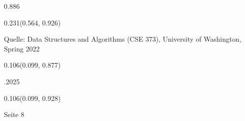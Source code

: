 \documentclass[aspectratio=169]{beamer}
\begin{document}
\begin{frame}[fragile]
\begin{textblock}{0.886}
\begin{minipage}[t][0.131\paperheight]{\linewidth}
  \end{minipage}
\end{textblock}
\begin{textblock}{0.231}(0.564, 0.926)
  \begin{minipage}[b][0.032\paperheight]{\linewidth}
    \raggedright
    \fontsize{3}{3.3}\selectfont Quelle: Data Structures and Algorithms (CSE 373), University of Washington, Spring 2022
  \end{minipage}
\end{textblock}
\begin{textblock}{0.106}(0.099, 0.877)
  \begin{minipage}[b][0.026\paperheight]{\linewidth}
    \raggedright
    \fontsize{3}{3.3}.2025
  \end{minipage}
\end{textblock}
\begin{textblock}{0.106}(0.099, 0.928)
  \begin{minipage}[b][0.031\paperheight]{\linewidth}
    \raggedright
    \fontsize{3}{3.3}\selectfont Seite 8
  \end{minipage}
\end{textblock}
\end{frame}
\end{document}
